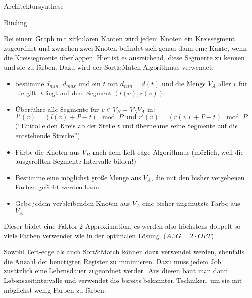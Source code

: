 \begin{chapter}{Architektursynthese}
\begin{section}{Binding}
 
 Bei einem \f{Graph mit zirkulären Kanten} wird jedem Knoten ein Kreissegment zugeordnet und zwischen zwei Knoten befindet sich genau dann eine Kante, wenn die Kreissegmente überlappen. Hier ist es ausreichend, diese Segmente zu kennen und sie zu färben. Dazu wird der \f{Sort\&Match Algorithmus} verwendet:
 
 \begin{itemize}
  \item bestimme $d_{min}$, $d_{max}$ und ein $t$ mit $d_{min} = d(t)$ und die Menge $V_A$ aller $v$ für die gilt: $t$ liegt auf dem Segment $(l(v),r(v))$.
  \item Überführe alle Segmente für $v\in V_B = V\setminus V_A$ in:
  \[ l'(v) = (l(v) + P - t)\mod P \text{ und } r'(v) = (r(v)+P-t)\mod P \] 
  (``Entrolle den Kreis ab der Stelle $t$ und übernehme seine Segmente auf die entstehende Strecke'')
  \item Färbe die Knoten aus $V_B$ nach dem \f{Left-edge Algorithmus} (möglich, weil die ausgerollten Segmente Intervalle bilden!)
  \item Bestimme eine möglichst große Menge aus $V_A$, die mit den bisher vergebenen Farben gefärbt werden kann.
  \item Gebe jedem verbleibenden Knoten aus $V_A$ eine bisher ungenutzte Farbe aus $V_A$
 \end{itemize}
Dieser bildet eine Faktor-2-Approximation, es werden also höchstens doppelt so viele Farben verwendet wie in der optimalen Lösung. ($ALG = 2\cdot OPT$)
 
 Sowohl \f{Left-edge} als auch \f{Sort\&Match} können dazu verwendet werden, ebenfalls die Anzahl der benötigten Register zu minimieren. Dazu muss jedem Job zusätzlich eine Lebensdauer zugeordnet werden. Aus diesen baut man dann Lebenszeitintervalle und verwendet die bereits bekannten Techniken, um sie mit möglichst wenig Farben zu färben.

\end{section}


\end{chapter}
